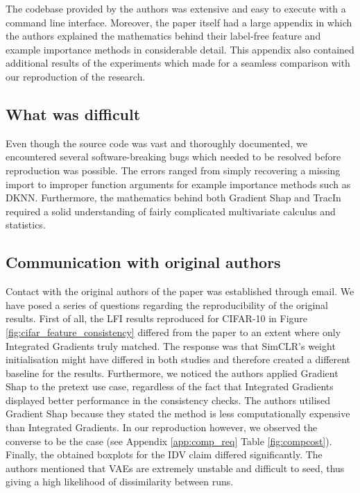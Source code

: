 The codebase provided by the authors was extensive and easy to execute with a command line interface. Moreover, the paper itself had a large appendix in which the authors explained the mathematics behind their label-free feature and example importance methods in considerable detail. This appendix also contained additional results of the experiments which made for a seamless comparison with our reproduction of the research. 

\subsection{What was difficult}
Even though the source code was vast and thoroughly documented, we encountered several software-breaking bugs which needed to be resolved before reproduction was possible. The errors ranged from simply recovering a missing import to improper function arguments for example importance methods such as DKNN. Furthermore, the mathematics behind both Gradient Shap and TracIn required a solid understanding of fairly complicated multivariate calculus and statistics.

\subsection{Communication with original authors}
Contact with the original authors of the paper was established through email. We have posed a series of questions regarding the reproducibility of the original results. First of all, the LFI results reproduced for CIFAR-10 in Figure \ref{fig:cifar_feature_consistency} differed from the paper to an extent where only Integrated Gradients truly matched. The response was that SimCLR's weight initialisation might have differed in both studies and therefore created a different baseline for the results. Furthermore, we noticed the authors applied Gradient Shap to the pretext use case, regardless of the fact that Integrated Gradients displayed better performance in the consistency checks. The authors utilised Gradient Shap because they stated the method is less computationally expensive than Integrated Gradients. In our reproduction however, we observed the converse to be the case (see Appendix \ref{app:comp_req} Table \ref{fig:compcost}). Finally, the obtained boxplots for the IDV claim differed significantly. The authors mentioned that VAEs are extremely unstable and difficult to seed, thus giving a high likelihood of dissimilarity between runs.
